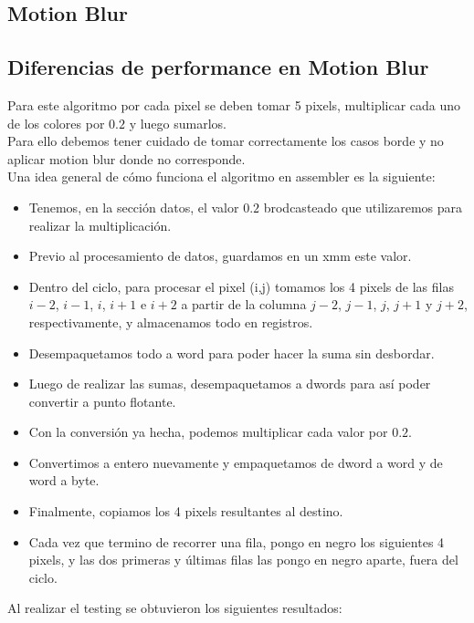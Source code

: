 \documentclass[a4paper]{article}
\begin{document}
\newpage
\subsection{Motion Blur}
\subsection{Diferencias de performance en Motion Blur}
Para este algoritmo por cada pixel se deben tomar 5 pixels, multiplicar cada uno de los colores por $0.2$ y luego sumarlos.
\\
Para ello debemos tener cuidado de tomar correctamente los casos borde y no aplicar motion blur donde no corresponde.
\\
Una idea general de cómo funciona el algoritmo en assembler es la siguiente:

\begin{itemize}
\item  Tenemos, en la sección datos, el valor $0.2$ brodcasteado que utilizaremos para realizar la multiplicación.
\item  Previo al procesamiento de datos, guardamos en un xmm este valor.
\item  Dentro del ciclo, para procesar el pixel (i,j) tomamos los 4 pixels de las filas $i-2$, $i-1$, $i$, $i+1$ e $i+2$ a partir de la columna $j-2$, $j-1$, $j$, $j+1$ y $j+2$, respectivamente, y almacenamos todo en registros.
\item  Desempaquetamos todo a word para poder hacer la suma sin desbordar.
\item  Luego de realizar las sumas, desempaquetamos a dwords para así poder convertir a punto flotante.
\item  Con la conversión ya hecha, podemos multiplicar cada valor por $0.2$.
\item  Convertimos a entero nuevamente y empaquetamos de dword a word y de word a byte.
\item  Finalmente, copiamos los 4 pixels resultantes al destino. 
\item  Cada vez que termino de recorrer una fila, pongo en negro los siguientes 4 pixels, y las dos primeras y últimas filas las pongo en negro aparte, fuera del ciclo.
\end{itemize}

Al realizar el testing se obtuvieron los siguientes resultados:
\end{document}
